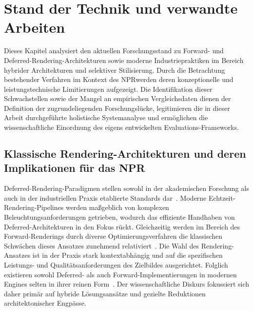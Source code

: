 \chapter{Stand der Technik und verwandte Arbeiten}
\label{ch:03_introduction}

Dieses Kapitel analysiert den aktuellen Forschungsstand zu Forward- und Deferred-Rendering-Architekturen sowie moderne
Industriepraktiken im Bereich hybrider Architekturen und selektiver Stilisierung.
Durch die Betrachtung bestehender Verfahren im Kontext des \ac{NPR}werden deren konzeptionelle und leistungstechnische
Limitierungen aufgezeigt.
Die Identifikation dieser Schwachstellen sowie der Mangel an empirischen Vergleichsdaten dienen der Definition der
zugrundeliegenden Forschungslücke, legitimieren die in dieser Arbeit durchgeführte holistische Systemanalyse und
ermöglichen die wissenschaftliche Einordnung des eigens entwickelten Evaluations-Frameworks.


\section{Klassische Rendering-Architekturen und deren Implikationen für das NPR}
\label{sec:0301_academic_state}

Deferred-Rendering-Paradigmen stellen sowohl in der akademischen Forschung als auch in der industriellen Praxis
etablierte Standards dar~\cite[S.~2]{mallettDeferredAdaptiveCompute2018}.
Moderne Echtzeit-Rendering-Pipelines werden maßgeblich von komplexen Beleuchtungsanforderungen getrieben, wodurch das
effiziente Handhaben von Deferred-Architekturen in den Fokus rückt.
Gleichzeitig werden im Bereich des Forward-Renderings durch diverse Optimierungsverfahren die klassischen Schwächen
dieses Ansatzes zunehmend
relativiert~\cite{olssonClusteredDeferredForward2012, haradaForwardBringingDeferred2012}.
Die Wahl des Rendering-Ansatzes ist in der Praxis stark kontextabhängig und auf die spezifischen Leistungs- und
Qualitätsanforderungen des Zielbildes ausgerichtet.
Folglich existieren sowohl Deferred- als auch Forward-Implementierungen in modernen Engines selten in ihrer reinen
Form~\cite[S.~56]{burnsVisibilityBufferCacheFriendly2013}.
Der wissenschaftliche Diskurs fokussiert sich daher primär auf hybride Lösungsansätze und gezielte Reduktionen
architektonischer Engpässe.

